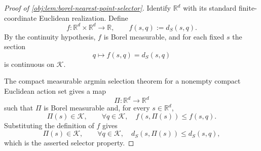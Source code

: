 \begin{proof}[Proof of \cref{obj:lem:borel-nearest-point-selector}]
Identify \(\mathbb R^d\) with its standard finite-coordinate Euclidean realization.  Define
\[
f:\mathbb R^d\times\mathbb R^d\to\mathbb R,
\qquad
f(s,q):=d_S(s,q).
\]
By the continuity hypothesis, \(f\) is Borel measurable, and for each fixed \(s\) the section
\[
q\longmapsto f(s,q)=d_S(s,q)
\]
is continuous on \(\mathcal K\). %

The compact measurable argmin selection theorem for a nonempty compact Euclidean action set gives a map
\[
\Pi:\mathbb R^d\to\mathbb R^d
\]
such that \(\Pi\) is Borel measurable and, for every \(s\in\mathbb R^d\),
\[
\Pi(s)\in\mathcal K,
\qquad
\forall q\in\mathcal K,\quad f(s,\Pi(s))\le f(s,q).
\]
Substituting the definition of \(f\) gives
\[
\Pi(s)\in\mathcal K,
\qquad
\forall q\in\mathcal K,\quad d_S(s,\Pi(s))\le d_S(s,q),
\]
which is the asserted selector property. %
\end{proof}

